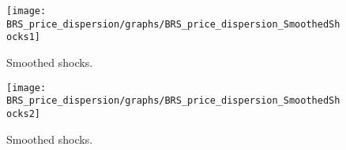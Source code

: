 
\begin{figure}[H]
\centering 
\texttt{[image: BRS\_price\_dispersion/graphs/BRS\_price\_dispersion\_SmoothedShocks1]}
\caption{Smoothed shocks.}\label{Fig:SmoothedShocks:1}
\end{figure}

\begin{figure}[H]
\centering 
\texttt{[image: BRS\_price\_dispersion/graphs/BRS\_price\_dispersion\_SmoothedShocks2]}
\caption{Smoothed shocks.}\label{Fig:SmoothedShocks:2}
\end{figure}



